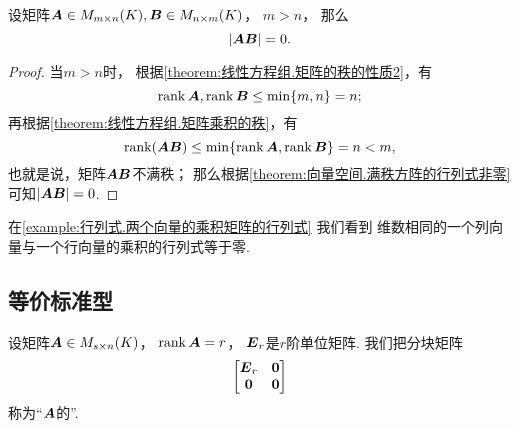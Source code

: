 \begin{theorem}\label{theorem:矩阵乘积的秩.多行少列矩阵与少行多列矩阵的乘积的行列式}
设矩阵\(\boldsymbol{A} \in M_{m \times n}(K),
\boldsymbol{B} \in M_{n \times m}(K)\)，
\(m > n\)，
那么\begin{equation*}
	\abs{\boldsymbol{A} \boldsymbol{B}} = 0.
\end{equation*}
\begin{proof}
当\(m>n\)时，
根据\cref{theorem:线性方程组.矩阵的秩的性质2}，有\begin{equation*}
	\rank\boldsymbol{A},\rank\boldsymbol{B} \leq \min\{m,n\} = n;
\end{equation*}
再根据\cref{theorem:线性方程组.矩阵乘积的秩}，有\begin{equation*}
	\rank(\boldsymbol{A} \boldsymbol{B}) \leq \min\{\rank\boldsymbol{A},\rank\boldsymbol{B}\} = n < m,
\end{equation*}
也就是说，矩阵\(\boldsymbol{A} \boldsymbol{B}\)不满秩；
那么根据\cref{theorem:向量空间.满秩方阵的行列式非零} 可知\(\abs{\boldsymbol{A} \boldsymbol{B}} = 0\).
\end{proof}
\end{theorem}
\begin{remark}
在\cref{example:行列式.两个向量的乘积矩阵的行列式} 我们看到
维数相同的一个列向量与一个行向量的乘积的行列式等于零.
\end{remark}

\subsection{等价标准型}
\begin{definition}
设矩阵\(\boldsymbol{A} \in M_{s \times n}(K)\)，
\(\rank\boldsymbol{A} = r\)，
\(\boldsymbol{E}_r\)是\(r\)阶单位矩阵.
我们把分块矩阵\begin{equation*}
	\begin{bmatrix}
		\boldsymbol{E}_r & \boldsymbol0 \\
		\boldsymbol0 & \boldsymbol0
	\end{bmatrix}
\end{equation*}
称为“\(\boldsymbol{A}\)的”.
\end{definition}

